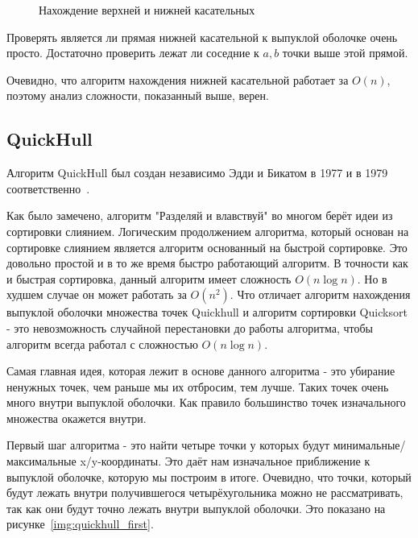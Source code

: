 \begin{figure}
	{\centering
		\hfill
		\subbottom[\label{img:merge_1}]{%
			}
		\hfill
		\subbottom[\label{img:merge_2}]{%
			}
		\hfill
	}
	\caption{Нахождение верхней и нижней касательных}
	\label{img:merge}
\end{figure}


Проверять является ли прямая нижней касательной к выпуклой оболочке очень просто. Достаточно проверить лежат ли соседние к $a, b$ точки выше этой прямой.

Очевидно, что алгоритм нахождения нижней касательной работает за $O(n)$, поэтому анализ сложности, показанный выше, верен.

\subsection{QuickHull} \label{subsect1_1_4}

Алгоритм QuickHull был создан независимо Эдди и Бикатом в 1977 и в 1979 соответственно~\cite{barber1996Quickhull}.

Как было замечено, алгоритм "Разделяй и влавствуй" во многом берёт идеи из сортировки слиянием. Логическим продолжением алгоритма, который основан на сортировке слиянием является алгоритм основанный на быстрой сортировке. Это довольно простой и в то же время быстро работающий алгоритм. В точности как и быстрая сортировка, данный алгоритм имеет сложность $O(n \log n)$. Но в худшем случае он может работать за $O(n^2)$. Что отличает алгоритм нахождения выпуклой оболочки множества точек Quickhull и алгоритм сортировки Quicksort - это невозможность случайной перестановки до работы алгоритма, чтобы алгоритм всегда работал с сложностью $O(n \log n)$.

Самая главная идея, которая лежит в основе данного алгоритма - это убирание ненужных точек, чем раньше мы их отбросим, тем лучше. Таких точек очень много внутри выпуклой оболочки. Как правило большинство точек изначального множества окажется внутри.

Первый шаг алгоритма - это найти четыре точки у которых будут минимальные/максимальные x/y-координаты. Это даёт нам изначальное приближение к выпуклой оболочке, которую мы построим в итоге. Очевидно, что точки, который будут лежать внутри получившегося четырёхугольника можно не рассматривать, так как они будут точно лежать внутри выпуклой оболочки. Это показано на рисунке~\ref{img:quickhull_first}.

